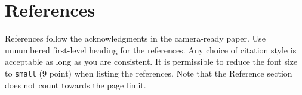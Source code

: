 \documentclass{article}
\begin{document}
\section*{References}


References follow the acknowledgments in the camera-ready paper. Use unnumbered first-level heading for
the references. Any choice of citation style is acceptable as long as you are
consistent. It is permissible to reduce the font size to \verb+small+ (9 point)
when listing the references.
Note that the Reference section does not count towards the page limit.
\medskip


{
\small




}
\end{document}
